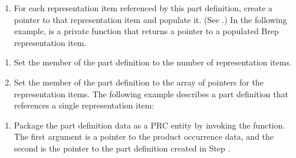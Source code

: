 \documentclass[letterpaper,12pt,english,openany,oneside]{sphinxmanual}
\begin{document}
\begin{sphinxVerbatim}[commandchars=\\\{\}]
 
\end{sphinxVerbatim}
\begin{enumerate}
%
\setcounter{enumi}{2}
\item {} 
For each representation item referenced by this part definition, create a pointer to that representation item and populate it. (See .) In the following example,  is a private function that returns a pointer to a populated Brep representation item.

\end{enumerate}

\begin{sphinxVerbatim}[commandchars=\\\{\}]
   
\end{sphinxVerbatim}
\begin{enumerate}
%
\setcounter{enumi}{3}
\item {} 
Set the  member of the part definition to the number of representation items.

\item {} 
Set the  member of the part definition to the array of pointers for the representation items. The following example describes a part definition that references a single representation item:

\end{enumerate}

\begin{sphinxVerbatim}[commandchars=\\\{\}]
  
  
\end{sphinxVerbatim}
\begin{enumerate}
%
\setcounter{enumi}{5}
\item {} 
Package the part definition data as a PRC entity by invoking the  function. The first argument is a pointer to the product occurrence data, and the second is the pointer to the part definition created in Step .

\end{enumerate}
\end{document}
